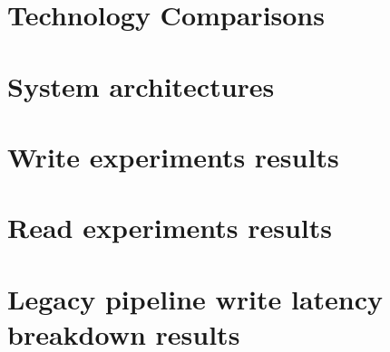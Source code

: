 \chapter{Technology Comparisons}
    \label{appx:tech_comp}
    

\chapter{System architectures}
    \label{appx:sys_arch}
    

\chapter{Write experiments results}
    \label{appx:res_write}
    

\chapter{Read experiments results}
    \label{appx:res_read}
    

\chapter{Legacy pipeline write latency breakdown results}
    \label{appx:res_hudi}
    